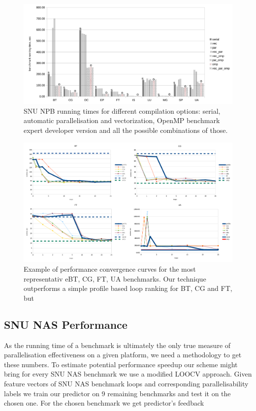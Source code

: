 \documentclass[sigconf,10pt,review,anonymous]{acmart}
\begin{document}
\begin{figure}[t!]
\centering
\includegraphics[width=\textwidth]{figures/benchmark_runtime.pdf}
\caption{SNU NPB running times for different compilation options: serial, automatic parallelisation and vectorization, OpenMP benchmark expert developer version and all the possible combinations of those.}
\label{fig:snu_npb_performance}
\end{figure}

\begin{figure}[t!]
\centering
\includegraphics[width=\textwidth]{figures/bt_ft_cg_ua_parallelisation.pdf}
\caption{Example of performance convergence curves for the most representativ eBT, CG, FT, UA benchmarks. Our technique outperforms a simple profile based loop ranking for BT, CG and FT, but  }
\label{fig:performance_convergence_line}
\end{figure}

\subsection{SNU NAS Performance}
\quad As the running time of a benchmark is ultimately the only true measure of parallelisation effectiveness on a given platform, we need a methodology to get these numbers. To estimate potential performance speedup our scheme might bring for every SNU NAS benchmark we use a modified LOOCV approach. Given feature vectors of SNU NAS benchmark loops and corresponding parallelisability labels we train our predictor on 9 remaining benchmarks and test it on the chosen one. For the chosen benchmark we get predictor's feedback        
\end{document}
